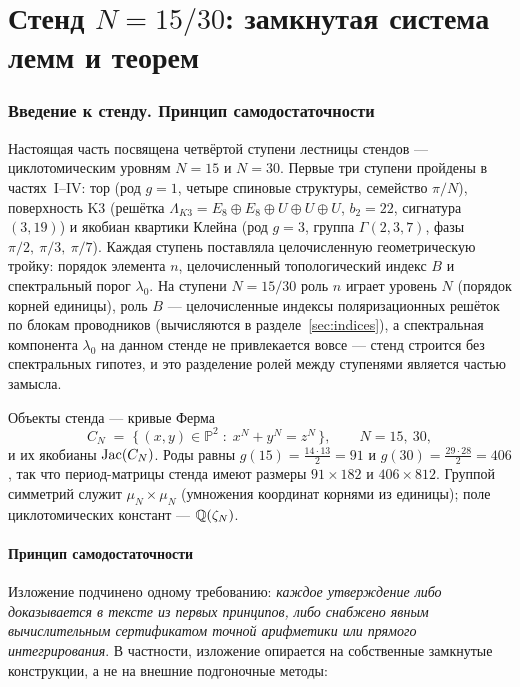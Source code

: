\part{Стенд $N=15/30$: замкнутая система лемм и теорем}

\section{Введение к стенду. Принцип самодостаточности}\label{sec:cyclo-intro}

Настоящая часть посвящена четвёртой ступени лестницы стендов ---
циклотомическим уровням $N=15$ и $N=30$. Первые три ступени пройдены
в частях~I--IV: тор (род $g=1$, четыре спиновые структуры, семейство
$\pi/N$), поверхность K3 (решётка
$\Lambda_{K3}=E_8\oplus E_8\oplus U\oplus U\oplus U$, $b_2=22$,
сигнатура $(3,19)$) и якобиан квартики Клейна (род $g=3$, группа
$\Gamma(2,3,7)$, фазы $\pi/2,\ \pi/3,\ \pi/7$). Каждая ступень
поставляла целочисленную геометрическую тройку: порядок элемента $n$,
целочисленный топологический индекс $B$ и спектральный порог
$\lambda_0$. На ступени $N=15/30$ роль $n$ играет уровень $N$ (порядок
корней единицы), роль $B$ --- целочисленные индексы поляризационных
решёток по блокам проводников (вычисляются в
разделе~\ref{sec:indices}), а спектральная компонента $\lambda_0$ на
данном стенде не привлекается вовсе --- стенд строится без спектральных
гипотез, и это разделение ролей между ступенями является частью
замысла.

Объекты стенда --- кривые Ферма
\begin{equation}\label{eq:fermat}
  C_N \;=\; \{\, (x,y)\in \mathbb{P}^2 \;:\; x^N + y^N = z^N \,\},
  \qquad N = 15,\ 30,
\end{equation}
и их якобианы $\operatorname{Jac}(C_N)$. Роды равны
$g(15)=\tfrac{14\cdot 13}{2}=91$ и $g(30)=\tfrac{29\cdot 28}{2}=406$,
так что период-матрицы стенда имеют размеры $91\times 182$ и
$406\times 812$. Группой симметрий служит $\mu_N\times\mu_N$
(умножения координат корнями из единицы); поле циклотомических
констант --- $\mathbb{Q}(\zeta_N)$.

\subsection{Принцип самодостаточности}

Изложение подчинено одному требованию: \emph{каждое утверждение либо
доказывается в тексте из первых принципов, либо снабжено явным
вычислительным сертификатом точной арифметики или прямого
интегрирования}. В частности, изложение опирается на собственные
замкнутые конструкции, а не на внешние подгоночные методы:

